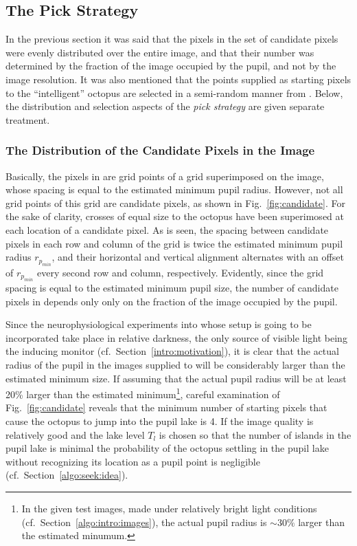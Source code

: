 \subsection{The Pick Strategy}
\label{algo:seek:strategy}

In the previous section it was said that the pixels in the set {\SS}
of candidate pixels were evenly distributed over the entire image, and
that their number was determined by the fraction of the image occupied
by the pupil, and not by the image resolution.  It was also mentioned
that the points supplied as starting pixels to the ``intelligent''
octopus are selected in a semi-random manner from {\SS}.  Below, the
distribution and selection aspects of the {\em pick strategy\/} are
given separate treatment.

\subsubsection{The Distribution of the Candidate Pixels in the Image}


Basically, the pixels in {\SS} are grid points of a grid superimposed
on the image, whose spacing is equal to the estimated minimum pupil
radius.  However, not all grid points of this grid are candidate
pixels, as shown in Fig.~\ref{fig:candidate}.  For the sake of
clarity, crosses of equal size to the octopus have been superimosed at
each location of a candidate pixel.  As is seen, the spacing between
candidate pixels in each row and column of the grid is twice the
estimated minimum pupil radius $r_{p_{min}}$, and their horizontal and
vertical alignment alternates with an offset of $r_{p_{min}}$ every
second row and column, respectively.  Evidently, since the grid
spacing is equal to the estimated minimum pupil size, the number of
candidate pixels in {\SS} depends only only on the fraction of the
image occupied by the pupil.

Since the neurophysiological experiments into whose setup {\octopus}
is going to be incorporated take place in relative darkness, the only
source of visible light being the inducing monitor (cf.\ 
Section~\ref{intro:motivation}), it is clear that the actual radius of
the pupil in the images supplied to {\octopus} will be considerably
larger than the estimated minimum size.  If assuming that the actual
pupil radius will be at least 20\% larger than the estimated
minimum\footnote{In the given test images, made under relatively
  bright light conditions (cf.\ Section~\ref{algo:intro:images}), the
  actual pupil radius is $\sim 30\%$ larger than the estimated
  minumum.}, careful examination of Fig.~\ref{fig:candidate} reveals
that the minimum number of starting pixels that cause the octopus to
jump into the pupil lake is 4.  If the image quality is relatively
good and the lake level $T_{l}$ is chosen so that the number of
islands in the pupil lake is minimal the probability of the octopus
settling in the pupil lake without recognizing its location as a pupil
point is negligible (cf.\ Section~\ref{algo:seek:idea}).

